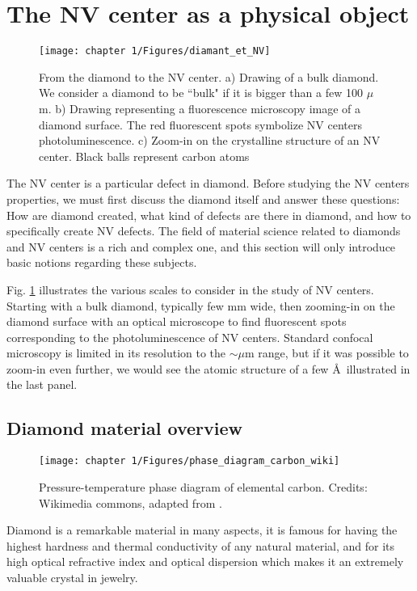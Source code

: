 \documentclass[a4paper, 11pt]{book}
\begin{document}
\section{The NV center as a physical object}
\begin{figure}[h!]
\centering
\texttt{[image: chapter 1/Figures/diamant\_et\_NV]}
\caption{From the diamond to the NV center. a) Drawing of a bulk diamond. We consider a diamond to be ``bulk" if it is bigger than a few 100 $\mu$m. b) Drawing representing a fluorescence microscopy image of a diamond surface. The red fluorescent spots symbolize NV centers photoluminescence. c) Zoom-in on the crystalline structure of an NV center. Black balls represent carbon atoms}
\label{diamond+NV}
\end{figure}
The NV center is a particular defect in diamond. Before studying the NV centers properties, we must first discuss the diamond itself and answer these questions: How are diamond created, what kind of defects are there in diamond, and how to specifically create NV defects. The field of material science related to diamonds and NV centers is a rich and complex one, and this section will only introduce basic notions regarding these subjects.

Fig. \ref{diamond+NV} illustrates the various scales to consider in the study of NV centers. Starting with a bulk diamond, typically few mm wide, then zooming-in on the diamond surface with an optical microscope to find fluorescent spots corresponding to the photoluminescence of NV centers. Standard confocal microscopy is limited in its resolution to the $\sim \mu$m range, but if it was possible to zoom-in even further, we would see the atomic structure of a few \AA \ illustrated in the last panel. 
\subsection{Diamond material overview}
\begin{figure}[h!]
\centering
\texttt{[image: chapter 1/Figures/phase\_diagram\_carbon\_wiki]}
\caption{Pressure-temperature phase diagram of elemental carbon. Credits: Wikimedia commons, adapted from \citep{bundy1989pressure, bundy1996pressure}.}
\label{carbon phase diagram}
\end{figure}

Diamond is a remarkable material in many aspects, it is famous for having the highest hardness and thermal conductivity of any natural material, and for its high optical refractive index and optical dispersion which makes it an extremely valuable crystal in jewelry.
\end{document}

